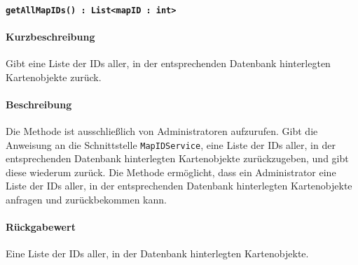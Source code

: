\paragraph{\texttt{getAllMapIDs() : List<mapID : int>}}%
\paragraph*{Kurzbeschreibung}
Gibt eine Liste der IDs aller, in der entsprechenden Datenbank hinterlegten Kartenobjekte zurück.
\paragraph*{Beschreibung}
Die Methode ist ausschließlich von Administratoren aufzurufen.
Gibt die Anweisung an die Schnittstelle \texttt{MapIDService}, eine Liste der IDs aller, in der entsprechenden Datenbank hinterlegten Kartenobjekte zurückzugeben, und gibt diese wiederum zurück.
Die Methode ermöglicht, dass ein Administrator eine Liste der IDs aller, in der entsprechenden Datenbank hinterlegten Kartenobjekte anfragen und zurückbekommen kann.
\paragraph*{Rückgabewert}
Eine Liste der IDs aller, in der Datenbank hinterlegten Kartenobjekte.

